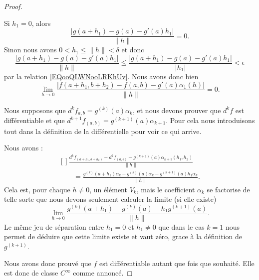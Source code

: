 \begin{proof}
\begin{subproof}
		Si \( h_1=0\), alors
		\begin{equation}
			\frac{ |g(a+h_1)-g(a)-g'(a)h_1| }{ \| h \| }=0.
		\end{equation}
		Sinon nous avons \( 0<h_1\leq\| h \|<\delta\) et donc
		\begin{equation}
			\frac{ |g(a+h_1)-g(a)-g'(a)h_1| }{ \| h \| }\leq\frac{ |g(a+h_1)-g(a)-g'(a)h_1| }{ | h_1 | }<\epsilon
		\end{equation}
		par la relation \eqref{EQooQLWNooLRKhUv}. Nous avons donc bien
		\begin{equation}
			\lim_{h\to 0}\frac{ |f(a+h_1,b+h_2)-f(a,b)-g'(a)\alpha_1(h)| }{ \| h \| }=0.
		\end{equation}

		\spitem[Récurrence]

		Nous supposons que \( d^kf_{a,b}=g^{(k)}(a)\alpha_k\), et nous devons prouver que \( d^kf\) est différentiable et que \( d^{k+1}f_{(a,b)}=g^{(k+1)}(a)\alpha_{k+1}\). Pour cela nous introduisons tout dans la définition de la différentielle pour voir ce qui arrive.

		Nous avons :
		\begin{equation}
			\begin{aligned}[]
				\frac{ d^kf_{(a+h_1,b+h_2)}-d^kf_{(a,b)}-g^{(k+1)}(a)\alpha_{k+1}(h_1,h_2) }{ \| h \| } \\
				\qquad=
				\frac{ g^{(k)}(a+h_1)\alpha_k-g^{(k)}(a)\alpha_k-g^{(k+1)}(a)h_1\alpha_k }{ \| h \| }.
			\end{aligned}
		\end{equation}
		Cela est, pour chaque \( h\neq 0\), un élément \( V_k\), mais le coefficient \( \alpha_k\) se factorise de telle sorte que nous devons seulement calculer la limite (si elle existe)
		\begin{equation}
			\lim_{h\to 0} \frac{ g^{(k)}(a+h_1)-g^{(k)}(a)-h_1g^{(k+1)}(a) }{ \| h \| }.
		\end{equation}
		Le même jeu de séparation entre \( h_1=0\) et \( h_1\neq 0\) que dans le cas \( k=1\) nous permet de déduire que cette limite existe et vaut zéro, grace à la définition de \( g^{(k+1)}\).
	\end{subproof}

	Nous avons donc prouvé que \( f\) est différentiable autant que fois que souhaité. Elle est donc de classe \(  C^{\infty}\) comme annoncé.
\end{proof}

